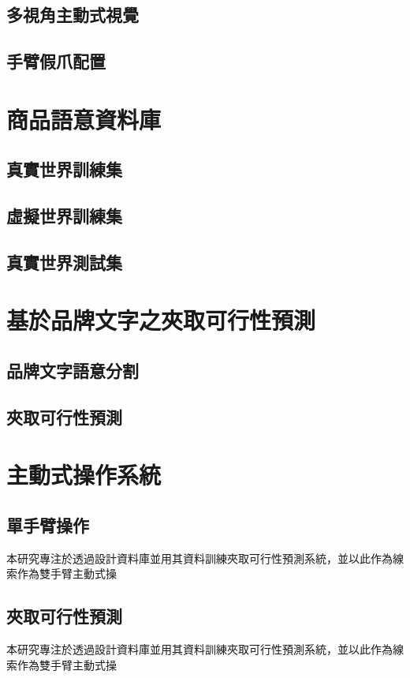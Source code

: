 \subsection{多視角主動式視覺}



\subsection{手臂假爪配置}



\section{商品語意資料庫}

\subsection{真實世界訓練集}

\subsection{虛擬世界訓練集}

\subsection{真實世界測試集}

\section{基於品牌文字之夾取可行性預測}

\subsection{品牌文字語意分割}

\subsection{夾取可行性預測}

\section{主動式操作系統}

\subsection{單手臂操作}
本研究專注於透過設計資料庫並用其資料訓練夾取可行性預測系統，並以此作為線索作為雙手臂主動式操

\subsection{夾取可行性預測}
本研究專注於透過設計資料庫並用其資料訓練夾取可行性預測系統，並以此作為線索作為雙手臂主動式操
